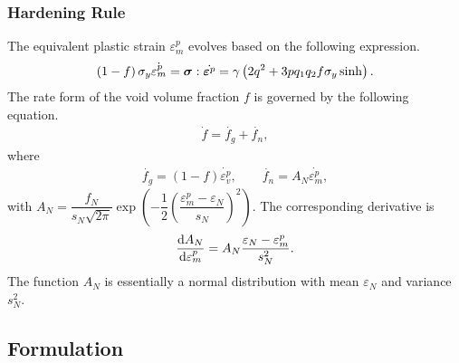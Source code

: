 \subsubsection{Hardening Rule}
The equivalent plastic strain $\varepsilon^p_m$ evolves based on the following expression.
\begin{gather}
\left(1-f\right)\sigma_y\dot{\varepsilon^p_m}=\bm{\sigma}:\dot{\bm{\varepsilon}^p}=\gamma\left(2q^2+3pq_1q_2f\sigma_y\sinh\right).
\end{gather}
The rate form of the void volume fraction $f$ is governed by the following equation.
\begin{gather}
\dot{f}=\dot{f_g}+\dot{f_n},
\end{gather}
where
\begin{gather}
\dot{f_g}=\left(1-f\right)\dot{\varepsilon^p_v},\qquad
\dot{f_n}=A_N\dot{\varepsilon^p_m},
\end{gather}
with $A_N=\dfrac{f_N}{s_N\sqrt{2\pi}}\exp\left(-\dfrac{1}{2}\left(\dfrac{\varepsilon^p_m-\varepsilon_N}{s_N}\right)^2\right)$. The corresponding derivative is
\begin{gather}
\dfrac{\mathrm{d}A_N}{\mathrm{d}\varepsilon^p_m}=A_N\dfrac{\varepsilon_N-\varepsilon^p_m}{s_N^2}.
\end{gather}
The function $A_N$ is essentially a normal distribution with mean $\varepsilon_N$ and variance $s_N^2$.
\subsection{Formulation}
